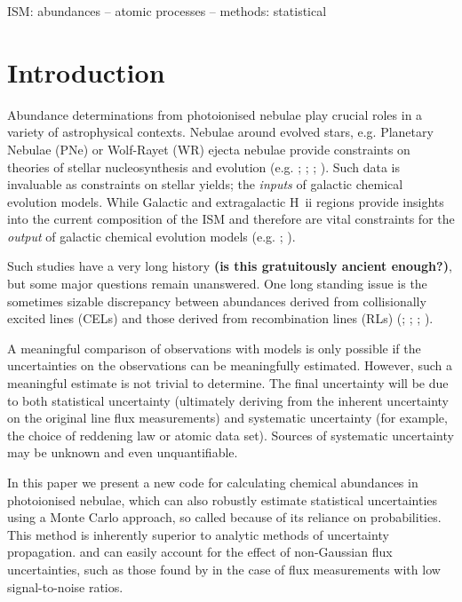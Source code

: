 \documentclass[useAMS,usenatbib]{mn2e}
\begin{document}
\begin{keywords}
ISM: abundances -- atomic processes -- methods: statistical
\end{keywords}

\section{Introduction}

Abundance determinations from photoionised nebulae play crucial roles in a variety of astrophysical contexts. Nebulae around evolved stars, e.g. Planetary Nebulae (PNe) or Wolf-Rayet (WR) ejecta nebulae provide constraints on theories of stellar nucleosynthesis and evolution (e.g. \citealt{2009ApJ...690.1130K};  \citealt{2011arXiv1110.1186M}; \citealt{1992A&A...264..105M}; \citealt{2011MNRAS.tmp.1754S}). Such data is invaluable as constraints on stellar yields; the \textit{inputs} of galactic chemical evolution models. While Galactic and extragalactic H~{\sc ii} regions provide insights into the current composition of the ISM and therefore are vital constraints for the \textit{output} of galactic chemical evolution models (e.g. \citealt{1997nceg.book.....P}; \citealt{2003ceg..book.....M}).

Such studies have a very long history \citep{1864RSPT..154..437H} \textbf{(is this gratuitously ancient enough?)}, but some major questions remain unanswered.  One long standing issue is the sometimes sizable discrepancy between abundances derived from collisionally excited lines (CELs) and those derived from recombination lines (RLs) (\citealt{2005MNRAS.362..424W}; \citet{2006MNRAS.368.1959L}; \citealt{2007ApJ...670..457G}; \citealt{2008MNRAS.386...22T}).

A meaningful comparison of observations with models is only possible if the uncertainties on the observations can be meaningfully estimated.  However, such a meaningful estimate is not trivial to determine.  The final uncertainty will be due to both statistical uncertainty (ultimately deriving from the inherent uncertainty on the original line flux measurements) and systematic uncertainty (for example, the choice of reddening law or atomic data set).  Sources of systematic uncertainty may be unknown and even unquantifiable.

In this paper we present a new code for calculating chemical abundances in photoionised nebulae, which can also robustly estimate statistical uncertainties using a Monte Carlo approach, so called because of its reliance on probabilities.  This method is inherently superior to analytic methods of uncertainty propagation. and can easily account for the effect of non-Gaussian flux uncertainties, such as those found by \citet{1994A&A...287..676R} in the case of flux measurements with low signal-to-noise ratios.
\end{document}
